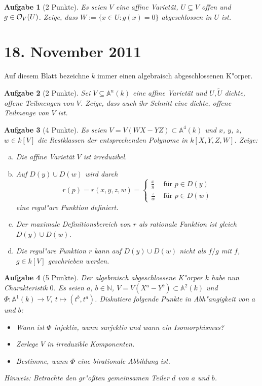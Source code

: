 \documentclass[a4paper, 12pt, numbers=noendperiod, chapterprefix=true]{scrbook}
\theoremstyle{break}
\newtheorem{Aufg}{Aufgabe}
\theoremstyle{nonumberbreak}
\theoremstyle{nonumberplain}
\newcommand{\N}{\mathbb{N}}
\newcommand{\A}{\mathbb{A}}
\newcommand{\Affine}{\mathbb{A}} %
\begin{document}
\begin{Aufg}[2 Punkte]
Es seien $V$ eine affine Variet\"at, $U\subseteq V$ offen und $g\in{\cal O}_V(U)$. Zeige, dass $W:= \{x\in U: g(x)=0\}$ abgeschlossen in $U$ ist.
\end{Aufg}

\newpage
\section{18. November 2011}
\setcounter{Aufg}{0}
\setcounter{Loes}{0}

Auf diesem Blatt bezeichne $k$ immer einen algebraisch abgeschlossenen K"orper.

\begin{Aufg}[2 Punkte]
Sei $V \subseteq \Affine^n(k)$ eine affine Variet\"at und $U,\tilde{U}$ dichte, offene Teilmengen von $V$. Zeige, dass auch ihr Schnitt eine dichte, offene Teilmenge von $V$ ist.
\end{Aufg}

\begin{Aufg}[4 Punkte]
Es seien $V = V(WX-YZ)\subset \Affine^4(k)$ und $x$, $y$, $z$, $w\in k[V]$ die Restklassen der entsprechenden Polynome in $k[X,Y,Z,W]$. Zeige:
\begin{enumerate}[a)]
	\item Die affine Varietät $V$ ist irreduzibel.
	\item Auf $D(y)\cup D(w)$ wird durch
		\[r(p) = r(x,y,z,w) = \begin{cases}
			\frac{x}{y} & \text{ für } p\in D(y)\\
			\frac{z}{w} & \text{ für } p\in D(w)
		\end{cases}\]
	eine regul"are Funktion definiert. 
	\item Der maximale Definitionsbereich von $r$ als rationale Funktion ist gleich $D(y)\cup D(w)$.
	\item Die regul"are Funktion $r$ kann auf $D(y)\cup D(w)$ nicht als $f/g$ mit $f$, $g\in k[V]$ geschrieben werden.
\end{enumerate}\end{Aufg}

\begin{Aufg}[5 Punkte]
Der algebraisch abgeschlossene K"orper $k$ habe nun Charakteristik $0$.
Es seien $a$, $b\in \N$, $V = V(X^a - Y^b)\subset \Affine^2(k)$ und $\Phi \colon\Affine^1(k)\to V$, $t\mapsto (t^b,t^a)$. Diskutiere folgende Punkte in Abh"angigkeit von $a$ und $b$:
\begin{itemize}
	\item Wann ist $\Phi$ injektiv, wann surjektiv und wann ein Isomorphismus? 
	\item Zerlege $V$ in irreduzible Komponenten.
	\item Bestimme, wann $\Phi$ eine birationale Abbildung ist.
\end{itemize}
\textit{Hinweis: Betrachte den gr"o\ss ten gemeinsamen Teiler $d$ von $a$ und $b$.}
\end{Aufg}
\end{document}
